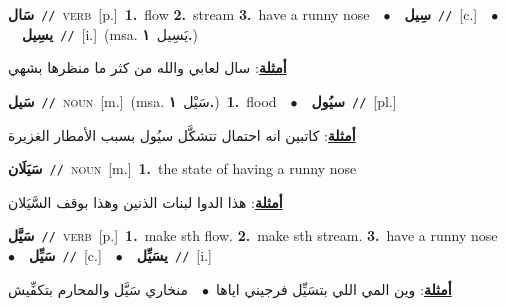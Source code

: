 \documentclass[10pt,a4paper,twoside]{article} %
\begin{document}
\begin{multicols}{2}
{\setlength\topsep{0pt}\textbf{\foreignlanguage{arabic}{سَال}}\ {\color{gray}\texttt{//}\color{black}}\ \textsc{verb}\ [p.]\ \textbf{1.}~flow  \textbf{2.}~stream  \textbf{3.}~have a runny nose\ \ $\bullet$\ \ \setlength\topsep{0pt}\textbf{\foreignlanguage{arabic}{سِيل}}\ {\color{gray}\texttt{//}\color{black}}\ [c.]\ \ $\bullet$\ \ \setlength\topsep{0pt}\textbf{\foreignlanguage{arabic}{يسِيل}}\ {\color{gray}\texttt{//}\color{black}}\ [i.]\ \color{gray}(msa. \foreignlanguage{arabic}{يَسِيل}~\foreignlanguage{arabic}{\textbf{١.}})\color{black}\  \begin{flushright}\color{gray}\foreignlanguage{arabic}{\textbf{\underline{\foreignlanguage{arabic}{أمثلة}}}: سال لعابي والله من كثر ما منظرها بشهي}\end{flushright}\color{black}} \vspace{2mm}

{\setlength\topsep{0pt}\textbf{\foreignlanguage{arabic}{سَيل}}\ {\color{gray}\texttt{//}\color{black}}\ \textsc{noun}\ [m.]\ \color{gray}(msa. \foreignlanguage{arabic}{سَيْل}~\foreignlanguage{arabic}{\textbf{١.}})\color{black}\ \textbf{1.}~flood\ \ $\bullet$\ \ \setlength\topsep{0pt}\textbf{\foreignlanguage{arabic}{سيُول}}\ {\color{gray}\texttt{//}\color{black}}\ [pl.]\  \begin{flushright}\color{gray}\foreignlanguage{arabic}{\textbf{\underline{\foreignlanguage{arabic}{أمثلة}}}: كاتبين انه احتمال تتشكَّل سيُول بسبب الأمطار الغزيرة}\end{flushright}\color{black}} \vspace{2mm}

{\setlength\topsep{0pt}\textbf{\foreignlanguage{arabic}{سَيَلَان}}\ {\color{gray}\texttt{//}\color{black}}\ \textsc{noun}\ [m.]\ \textbf{1.}~the state of having a runny nose\  \begin{flushright}\color{gray}\foreignlanguage{arabic}{\textbf{\underline{\foreignlanguage{arabic}{أمثلة}}}: هذا الدوا لبنات الذنين وهذا بوقف السَّيَلان}\end{flushright}\color{black}} \vspace{2mm}

{\setlength\topsep{0pt}\textbf{\foreignlanguage{arabic}{سَيَّل}}\ {\color{gray}\texttt{//}\color{black}}\ \textsc{verb}\ [p.]\ \textbf{1.}~make sth flow.  \textbf{2.}~make sth stream.  \textbf{3.}~have a runny nose\ \ $\bullet$\ \ \setlength\topsep{0pt}\textbf{\foreignlanguage{arabic}{سَيِّل}}\ {\color{gray}\texttt{//}\color{black}}\ [c.]\ \ $\bullet$\ \ \setlength\topsep{0pt}\textbf{\foreignlanguage{arabic}{يسَيِّل}}\ {\color{gray}\texttt{//}\color{black}}\ [i.]\  \begin{flushright}\color{gray}\foreignlanguage{arabic}{\textbf{\underline{\foreignlanguage{arabic}{أمثلة}}}: وين المي اللي بتسَيِّل فرجيني اياها\ $\bullet$\ \  منخاري سَيَّل والمحارم بتكفِّيش}\end{flushright}\color{black}} \vspace{2mm}


\end{multicols}
\end{document}
